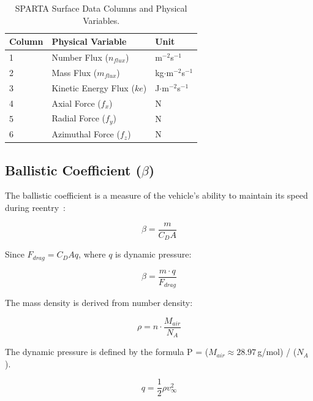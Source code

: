\begin{table}[H]
    \centering
    \caption{SPARTA Surface Data Columns and Physical Variables.}
    \label{tab:surface_data}
    \begin{tabular}{|l|l|l|}
        \hline
        \textbf{Column} & \textbf{Physical Variable} & \textbf{Unit} \\ \hline
        1 & Number Flux ($n_{flux}$) & m$^{-2}$s$^{-1}$ \\ \hline
        2 & Mass Flux ($m_{flux}$) & kg$\cdot$m$^{-2}$s$^{-1}$ \\ \hline
        3 & Kinetic Energy Flux ($ke$) & J$\cdot$m$^{-2}$s$^{-1}$ \\ \hline
        4 & Axial Force ($f_x$) & N \\ \hline
        5 & Radial Force ($f_y$) & N \\ \hline
        6 & Azimuthal Force ($f_z$) & N \\ \hline
    \end{tabular}
\end{table}

\subsection{Ballistic Coefficient (\texorpdfstring{$\beta$}{beta})}
\label{sec:ballistic}
The ballistic coefficient is a measure of the vehicle's ability to maintain its speed during reentry~\cite{AndersonHypersonic}:

\begin{equation}
    \beta = \frac{m}{C_D A}
\end{equation}

Since $F_{drag} = C_D A q$, where $q$ is dynamic pressure:

\begin{equation}
    \beta = \frac{m \cdot q}{F_{drag}}
\end{equation}

The mass density is derived from number density:

\begin{equation}
    \rho = n \cdot \frac{M_{air}}{N_A}
\end{equation}

The dynamic pressure is defined by the formula P = ($M_{air} \approx 28.97$\,g/mol) / ($N_A$).

\begin{equation}
    q = \frac{1}{2} \rho v_{\infty}^2
\end{equation}


